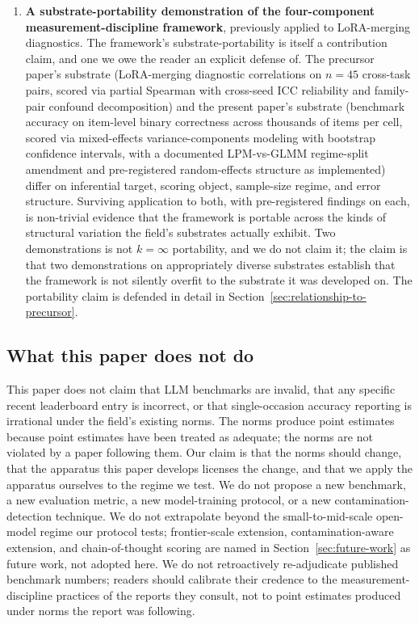 \documentclass[11pt]{article}
\begin{document}
\begin{sloppypar}
\begin{enumerate}
  \item \textbf{A substrate-portability demonstration of the four-component measurement-discipline framework}, previously applied to LoRA-merging diagnostics. The framework's substrate-portability is itself a contribution claim, and one we owe the reader an explicit defense of. The precursor paper's substrate (LoRA-merging diagnostic correlations on $n=45$ cross-task pairs, scored via partial Spearman with cross-seed ICC reliability and family-pair confound decomposition) and the present paper's substrate (benchmark accuracy on item-level binary correctness across thousands of items per cell, scored via mixed-effects variance-components modeling with bootstrap confidence intervals, with a documented LPM-vs-GLMM regime-split amendment and pre-registered random-effects structure as implemented) differ on inferential target, scoring object, sample-size regime, and error structure. Surviving application to both, with pre-registered findings on each, is non-trivial evidence that the framework is portable across the kinds of structural variation the field's substrates actually exhibit. Two demonstrations is not $k=\infty$ portability, and we do not claim it; the claim is that two demonstrations on appropriately diverse substrates establish that the framework is not silently overfit to the substrate it was developed on. The portability claim is defended in detail in Section~\ref{sec:relationship-to-precursor}.
\end{enumerate}
\end{sloppypar}

\subsection{What this paper does not do}
\label{sec:scope}

This paper does not claim that LLM benchmarks are invalid, that any specific recent leaderboard entry is incorrect, or that single-occasion accuracy reporting is irrational under the field's existing norms. The norms produce point estimates because point estimates have been treated as adequate; the norms are not violated by a paper following them. Our claim is that the norms should change, that the apparatus this paper develops licenses the change, and that we apply the apparatus ourselves to the regime we test. We do not propose a new benchmark, a new evaluation metric, a new model-training protocol, or a new contamination-detection technique. We do not extrapolate beyond the small-to-mid-scale open-model regime our protocol tests; frontier-scale extension, contamination-aware extension, and chain-of-thought scoring are named in Section~\ref{sec:future-work} as future work, not adopted here. We do not retroactively re-adjudicate published benchmark numbers; readers should calibrate their credence to the measurement-discipline practices of the reports they consult, not to point estimates produced under norms the report was following.
\end{document}

